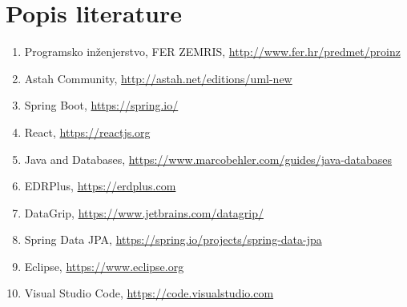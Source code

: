 \chapter*{Popis literature}
		
		
		\begin{enumerate}
			
			
			\item  Programsko inženjerstvo, FER ZEMRIS, \url{http://www.fer.hr/predmet/proinz}
			
			\item  Astah Community, \url{http://astah.net/editions/uml-new}
			
			\item Spring Boot, \url{https://spring.io/}
			
			\item React, \url{https://reactjs.org}
			
			\item Java and Databases, \url{https://www.marcobehler.com/guides/java-databases}
			
			\item EDRPlus, \url{https://erdplus.com}
			
			\item DataGrip, \url{https://www.jetbrains.com/datagrip/}
			
			\item Spring Data JPA, \url{https://spring.io/projects/spring-data-jpa}
			
			\item Eclipse, \url{https://www.eclipse.org}
			
			\item Visual Studio Code, \url{https://code.visualstudio.com}
			
			
			
			
			
		\end{enumerate}
		
		 
